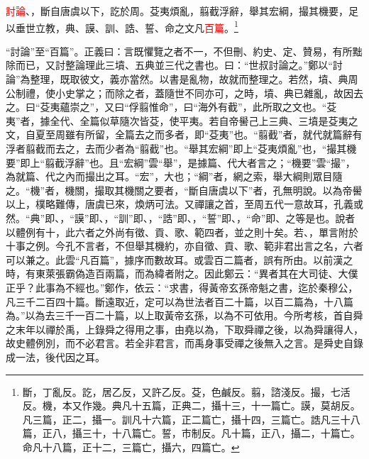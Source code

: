 \textcolor{red}{討論}、，斷自唐虞以下，訖於周。芟夷煩亂，翦截浮辭，舉其宏綱，撮其機要，足以垂世立教，典、謨、訓、誥、誓、命之文凡\textcolor{red}{百篇}。\footnote{斷，丁亂反。訖，居乙反，又許乙反。芟，色鹹反。翦，諮淺反。撮，七活反。機，本又作幾。典凡十五篇，正典二，攝十三，十一篇亡。謨，莫胡反。凡三篇，正二，攝一。訓凡十六篇，正二篇亡，攝十四，三篇亡。誥凡三十八篇，正八，攝三十，十八篇亡。誓，市制反。凡十篇，正八，攝二，十篇亡。命凡十八篇，正十二，三篇亡，攝六，四篇亡。}

{\noindent\shu{}\fzkt “討論”至“百篇”。正義曰：言既懼覽之者不一，不但刪、約史、定、贊易，有所黜除而已，又討整論理此三墳、五典並三代之書也。曰：“世叔討論之。”鄭以“討論”為整理，既取彼文，義亦當然。以書是亂物，故就而整理之。若然，墳、典周公制禮，使小史掌之；而除之者，蓋隨世不同亦可，之時，墳、典已雜亂，故因去之。曰“芟夷蘊崇之”，又曰“俘翦惟命”，曰“海外有截”，此所取之文也。“芟夷”者，據全代、全篇似草隨次皆芟，使平夷。若自帝嚳己上三典、三墳是芟夷之文，自夏至周雖有所留，全篇去之而多者，即“芟夷”也。“翦截”者，就代就篇辭有浮者翦截而去之，去而少者為“翦截”也。“舉其宏綱”即上“芟夷煩亂”也，“撮其機要”即上“翦截浮辭”也。且“宏綱”雲“舉”，是據篇、代大者言之；“機要”雲“撮”，為就篇、代之內而撮出之耳。“宏”，大也；“綱”者，網之索，舉大綱則眾目隨之。“機”者，機關，撮取其機關之要者，“斷自唐虞以下”者，孔無明說。以為帝嚳以上，樸略難傳，唐虞已來，煥炳可法。又禪讓之首，至周五代一意故耳，孔義或然。“典”即、，“謨”即、，“訓”即、，“誥”即、，“誓”即、，“命”即、之等是也。說者以體例有十，此六者之外尚有徵、貢、歌、範四者，並之則十矣。若、，單言附於十事之例。今孔不言者，不但舉其機約，亦自徵、貢、歌、範非君出言之名，六者可以兼之。此雲“凡百篇”，據序而數故耳。或雲百二篇者，誤有所由。以前漢之時，有東萊張霸偽造百兩篇，而為緯者附之。因此鄭云：“異者其在大司徒、大僕正乎？此事為不經也。”鄭作，依云：“求書，得黃帝玄孫帝魁之書，迄於秦穆公，凡三千二百四十篇。斷遠取近，定可以為世法者百二十篇，以百二篇為，十八篇為。”以為去三千一百二十篇，以上取黃帝玄孫，以為不可依用。今所考核，首自舜之末年以禪於禹，上錄舜之得用之事，由堯以為，下取舜禪之後，以為舜讓得人，故史體例別，而不必君言。若全非君言，而禹身事受禪之後無入之言。是舜史自錄成一法，後代因之耳。 \par}

